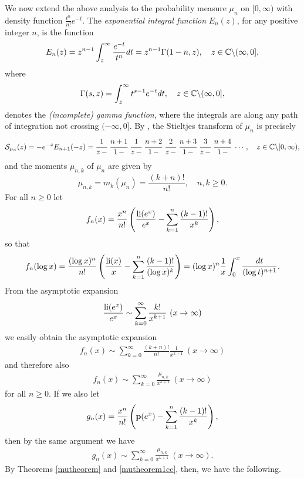 \documentclass[12pt]{article}
\begin{document}
We now extend the above analysis to the probability measure $\mu_n$ on $[0,\infty)$ with density function $\frac{t^{n}}{n!}e^{-t}$.   The {\it exponential integral function} $E_n(z)$, for any positive integer $n$, is the function
$$E_n(z) = z^{n-1}\int_{z}^\infty \frac{e^{-t}}{t^n} dt =  z^{n-1}\Gamma(1-n,z), \quad z \in {\mathbb C} \backslash (\infty,0],$$
where $$\Gamma(s,z) = \int_{z}^\infty t^{s-1}e^{-t} dt, \quad z \in {\mathbb C} \backslash (\infty,0],$$ denotes the {\it (incomplete) gamma function}, where the integrals are along any path of integration not crossing $(-\infty, 0]$.  By \cite[p.\ 277]{cuyt}, the Stieltjes transform of $\mu_n$ is precisely
$${\mathcal S}_{\mu_n}(z) = -e^{-z}E_{n+1}(-z) =  \cfrac{1}{z \,-} \  \cfrac{n+1}{1 \,-}\  \cfrac{1}{z \,-}\  \cfrac{n+2}{1 \,-}\  \cfrac{2}{z \,-}\  \cfrac{n+3}{1 \,-} \ \cfrac{3}{z \,-}\  \cfrac{n+4}{1 \,-} \ \cdots, \quad z \in \CC\backslash [0,\infty),$$
and the moments  $\mu_{n,k}$ of $\mu_n$ are given by
$$\mu_{n,k} = m_k(\mu_n) = \frac{(k+n)!}{n!}, \quad n, k \geq 0.$$
For all $n \geq 0$ let
\begin{align*}
f_n(x) = \frac{x^{n}}{n!}\left(\frac{\operatorname{li}(e^x)}{e^x} - \sum_{k = 1}^{n} \frac{(k-1)!}{x^{k}} \right),
\end{align*}
so that
$$f_n(\log x) = \frac{(\log x)^{n}}{n!}\left(\frac{\operatorname{li}(x)}{x} - \sum_{k = 1}^{n} \frac{(k-1)!}{(\log x)^{k}} \right) = {(\log x)^{n}}\frac{1}{x} \int_0^x \frac{dt} {(\log t)^{n+1}}.$$
From the asymptotic expansion
\begin{align*}
\frac{\operatorname{li}(e^x)}{e^x} \sim \sum_{k = 0}^\infty {\frac {k!}{x^{k+1}}} \ (x \to \infty)
\end{align*}
we easily obtain the asymptotic expansion
\begin{align*}
f_n(x) \sim \sum_{k = 0}^\infty \frac{(k+n)!}{n!} \frac{1}{x^{k+1}} \ (x \to \infty)
\end{align*}
and therefore also
\begin{align*}
f_n(x) \sim \sum_{k = 0}^\infty \frac{\mu_{n,k}}{x^{k+1}} \ (x \to \infty)
\end{align*}
for all $n \geq 0$.  If we also let
$$g_n(x) = \frac{x^{n}}{n!}\left({\mathbf p}(e^x) - \sum_{k = 1}^{n} \frac{(k-1)!}{x^{k}} \right),$$
then by the same argument we have
\begin{align*}
g_n(x) \sim \sum_{k = 0}^\infty \frac{\mu_{n,k}}{x^{k+1}} \ (x \to \infty).
\end{align*}
By Theorems \ref{mutheorem} and \ref{mutheorem1cc}, then, we have the following.
\end{document}
